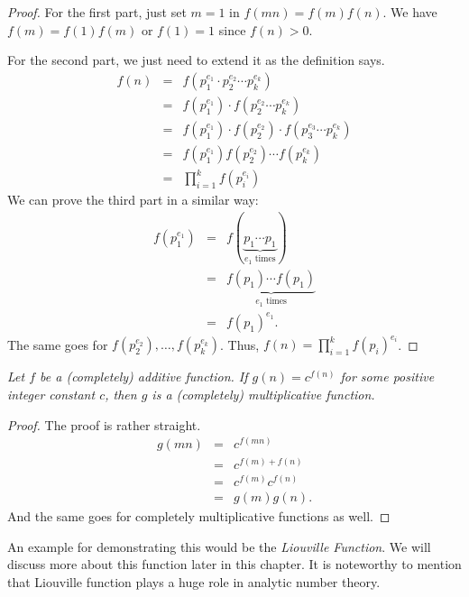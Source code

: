 \documentclass[12pt]{subfile}
\begin{document}
		\begin{proof}
			For the first part, just set $m=1$ in $f(mn)=f(m)f(n)$. We have $f(m)=f(1)f(m)$ or $f(1)=1$ since $f(n)>0$.
			
			For the second part, we just need to extend it as the definition says.
				\begin{eqnarray*}
					f(n) & = & f(p_1^{e_1}\cdot p_2^{e_2}\cdots p_k^{e_k})\\
						 & = & f(p_1^{e_1})\cdot f(p_2^{e_2}\cdots p_k^{e_k})\\
						 & = & f(p_1^{e_1})\cdot  f(p_2^{e_2}) \cdot f(p_3^{e_3}\cdots p_k^{e_k})\\					 
						 & = & f(p_1^{e_1})f(p_2^{e_2})\cdots f(p_k^{e_k})\\
						 & = & \prod_{i=1}^{k}f(p_i^{e_i})
				\end{eqnarray*}
			We can prove the third part in a similar way:
				\begin{eqnarray*}
					f(p_1^{e_1}) & = & f(\underbrace{p_1\cdots p_1}_{e_1 \text{ times}})\\
							 & = & \underbrace{f(p_1)\cdots f(p_1)}_{e_1\text{ times}}\\
							 & = & f(p_1)^{e_1}.
				\end{eqnarray*}
			The same goes for $f(p_2^{e_2}),\ldots, f(p_k^{e_k})$. Thus, $f(n)=\prod_{i=1}^{k}f(p_i)^{e_i}$.
		\end{proof}
		
		\begin{proposition}\slshape\label{prop:addtomul}
			Let $f$ be a (completely) additive function. If $g(n)=c^{f(n)}$ for some positive integer constant $c$, then $g$ is a (completely) multiplicative function.
		\end{proposition}
		
		\begin{proof}
			The proof is rather straight.
				\begin{eqnarray*}
					g(mn) & = & c^{f(mn)}\\
						  & = & c^{f(m)+f(n)}\\
						  & = & c^{f(m)}c^{f(n)}\\
						  & = & g(m)g(n).
				\end{eqnarray*}
			And the same goes for completely multiplicative functions as well.
		\end{proof}
	An example for demonstrating this would be the \textit{Liouville Function}. We will discuss more about this function later in this chapter. It is noteworthy to mention that Liouville function plays a huge role in analytic number theory.
	
\end{document}
